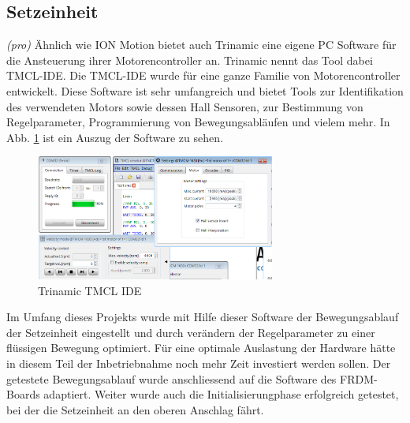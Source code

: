 \subsection{Setzeinheit} \label{sec:Inbetriebnahme_Setzeinheit}
\textit{(pro)} Ähnlich wie ION Motion bietet auch Trinamic eine eigene PC Software für die Ansteuerung ihrer Motorencontroller an. Trinamic nennt das Tool dabei TMCL-IDE. Die TMCL-IDE wurde für eine ganze Familie von Motorencontroller entwickelt. Diese Software ist sehr umfangreich und bietet Tools zur Identifikation des verwendeten Motors sowie dessen Hall Sensoren, zur Bestimmung von Regelparameter, Programmierung von Bewegungsabläufen und vielem mehr. In Abb. \ref{fig:TMCL-IDE} ist ein Auszug der Software zu sehen.

\begin{figure}[H]
	\includegraphics[width=0.7\textwidth]{Illustrationen/7-Inbetriebnahme_und_Kalibration/TMCL_IDE.png}
	\caption{Trinamic TMCL IDE}
	\label{fig:TMCL-IDE}
\end{figure}

Im Umfang dieses Projekts wurde mit Hilfe dieser Software der Bewegungsablauf der Setzeinheit eingestellt und durch verändern der Regelparameter zu einer flüssigen Bewegung optimiert. Für eine optimale Auslastung der Hardware hätte in diesem Teil der Inbetriebnahme noch mehr Zeit investiert werden sollen. Der getestete Bewegungsablauf wurde anschliessend auf die Software des FRDM-Boards adaptiert. Weiter wurde auch die Initialisierungphase erfolgreich getestet, bei der die Setzeinheit an den oberen Anschlag fährt.